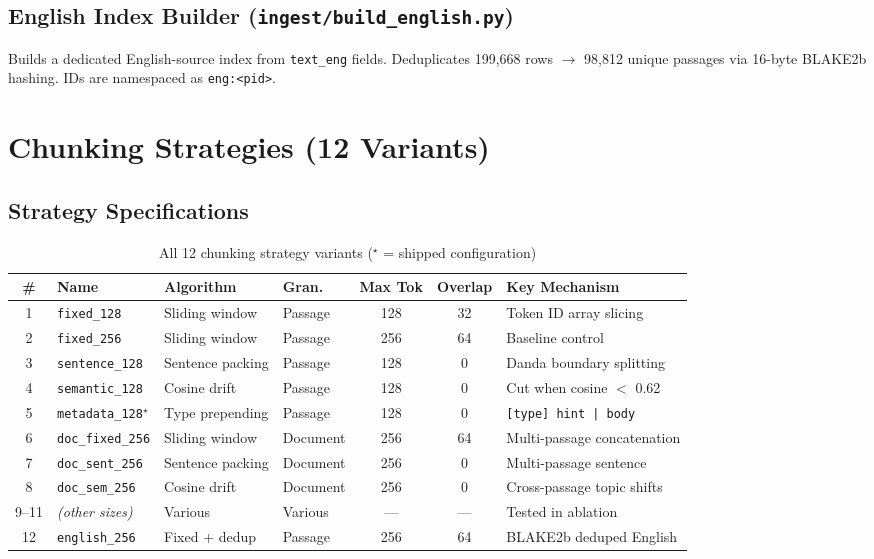 \documentclass[12pt,a4paper]{article}
\begin{document}
\subsection{English Index Builder (\texttt{ingest/build\_english.py})}

Builds a dedicated English-source index from \texttt{text\_eng} fields. Deduplicates 199,668 rows $\to$ 98,812 unique passages via 16-byte BLAKE2b hashing. IDs are namespaced as \texttt{eng:<pid>}.


\section{Chunking Strategies (12 Variants)}

\subsection{Strategy Specifications}

\begin{table}[H]
\centering
\small
\begin{tabularx}{\textwidth}{c l l l c c X}
\toprule
\textbf{\#} & \textbf{Name} & \textbf{Algorithm} & \textbf{Gran.} & \textbf{Max Tok} & \textbf{Overlap} & \textbf{Key Mechanism} \\
\midrule
1  & \texttt{fixed\_128}      & Sliding window    & Passage  & 128 & 32  & Token ID array slicing \\
2  & \texttt{fixed\_256}      & Sliding window    & Passage  & 256 & 64  & Baseline control \\
3  & \texttt{sentence\_128}   & Sentence packing  & Passage  & 128 & 0   & Danda boundary splitting \\
4  & \texttt{semantic\_128}   & Cosine drift      & Passage  & 128 & 0   & Cut when cosine $<$ 0.62 \\
5  & \texttt{metadata\_128}$^\star$  & Type prepending & Passage & 128 & 0 & \texttt{[type] hint | body} \\
6  & \texttt{doc\_fixed\_256} & Sliding window    & Document & 256 & 64  & Multi-passage concatenation \\
7  & \texttt{doc\_sent\_256}  & Sentence packing  & Document & 256 & 0   & Multi-passage sentence \\
8  & \texttt{doc\_sem\_256}   & Cosine drift      & Document & 256 & 0   & Cross-passage topic shifts \\
9--11 & \textit{(other sizes)} & Various          & Various  & --- & --- & Tested in ablation \\
12 & \texttt{english\_256}    & Fixed + dedup     & Passage  & 256 & 64  & BLAKE2b deduped English \\
\bottomrule
\end{tabularx}
\caption{All 12 chunking strategy variants ($^\star$ = shipped configuration)}
\end{table}
\end{document}
